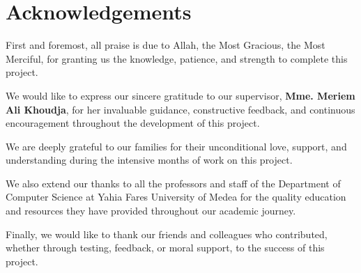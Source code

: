 \chapter*{Acknowledgements}

First and foremost, all praise is due to Allah, the Most Gracious, the Most Merciful, for granting us the knowledge, patience, and strength to complete this project.

We would like to express our sincere gratitude to our supervisor, \textbf{Mme. Meriem Ali Khoudja}, for her invaluable guidance, constructive feedback, and continuous encouragement throughout the development of this project.

We are deeply grateful to our families for their unconditional love, support, and understanding during the intensive months of work on this project.

We also extend our thanks to all the professors and staff of the Department of Computer Science at Yahia Fares University of Medea for the quality education and resources they have provided throughout our academic journey.

Finally, we would like to thank our friends and colleagues who contributed, whether through testing, feedback, or moral support, to the success of this project.
\newpage
